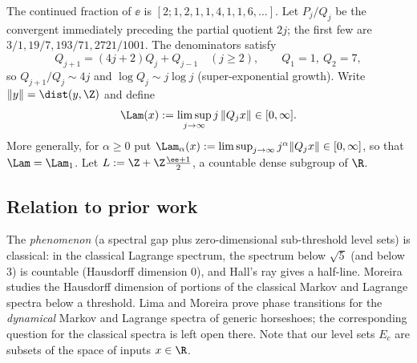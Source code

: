 The continued fraction of $\ee$ is $[2;1,2,1,1,4,1,1,6,\dots]$. Let $P_j/Q_j$
be the convergent immediately preceding the partial quotient $2j$; the first
few are $3/1,19/7,193/71,2721/1001$. The denominators satisfy
\begin{equation}\label{eq:rec}
Q_{j+1}=(4j+2)Q_j+Q_{j-1}\quad(j\ge2),\qquad Q_1=1,\ Q_2=7,
\end{equation}
so $Q_{j+1}/Q_j\sim 4j$ and $\log Q_j\sim j\log j$ (super-exponential growth).
Write $\|y\|=\dist(y,\Z)$ and define
\[
\Lam(x):=\limsup_{j\to\infty} j\,\|Q_j x\|\in[0,\infty].
\]
More generally, for $\alpha\ge0$ put
$\Lam_\alpha(x):=\limsup_{j\to\infty} j^\alpha\|Q_j x\|\in[0,\infty]$,
so that $\Lam=\Lam_1$.
Let $L:=\Z+\Z\frac{\ee+1}{2}$, a countable dense subgroup of $\R$.

\subsection{Relation to prior work}\label{sec:prior}

The \emph{phenomenon} (a spectral gap plus zero-dimensional sub-threshold level
sets) is classical: in the classical Lagrange spectrum, the spectrum below
$\sqrt5$ (and below $3$) is countable (Hausdorff dimension $0$), and Hall's ray
gives a half-line. Moreira \cite{Moreira} studies the Hausdorff dimension of
portions of the classical Markov and Lagrange spectra below a threshold. Lima
and Moreira \cite{LimaMoreira} prove phase transitions for the \emph{dynamical}
Markov and Lagrange spectra of generic horseshoes; the corresponding question
for the classical spectra is left open there. Note that our level sets $E_c$ are
subsets of the space of inputs $x\in\R$.

